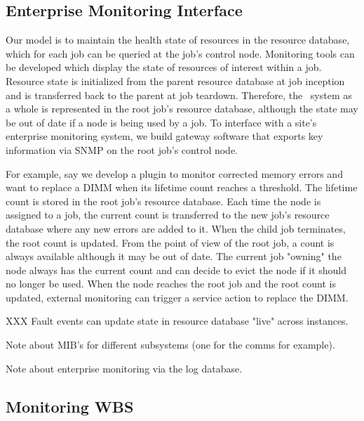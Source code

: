 \subsection{Enterprise Monitoring Interface}

Our model is to maintain the health state of resources in the resource
database, which for each job can be queried at the job's control node.
Monitoring tools can be developed which display the state of resources
of interest within a job.
Resource state is initialized from the parent resource database at job
inception and is transferred back to the parent at job teardown.
Therefore, the \ngrm\ system as a whole is represented in the root job's
resource database, although the state may be out of date if a node is
being used by a job.
To interface with a site's enterprise monitoring system, we build gateway
software that exports key information via SNMP on the root job's control node.  

For example, say we develop a plugin to monitor corrected memory errors
and want to replace a DIMM when its lifetime count reaches a threshold.
The lifetime count is stored in the root job's resource database.
Each time the node is assigned to a job, the current count is
transferred to the new job's resource database where any new errors are
added to it.  When the child job terminates, the root count is updated.
From the point of view of the root job, a count is always available
although it may be out of date.  The current job "owning" the node always
has the current count and can decide to evict the node if it should no
longer be used.  When the node reaches the root job and the root count
is updated, external monitoring can trigger a service action to replace
the DIMM.

XXX Fault events can update state in resource database "live" across instances.

Note about MIB's for different subsystems (one for the comms for example).

Note about enterprise monitoring via the log database.


\subsection{Monitoring WBS}

